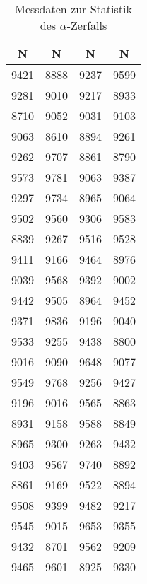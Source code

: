 \begin{table}[h!]
  \centering
  \caption{Messdaten zur Statistik des $\alpha$-Zerfalls}
  \label{tab:stat}
  \begin{tabular}{c c c c}
    \toprule
      N & N & N & N \\
    \midrule
      9421    &   8888    &    9237   &   9599\\
      9281    &   9010    &    9217   &   8933\\
      8710    &   9052    &    9031   &   9103\\
      9063    &   8610    &    8894   &   9261\\
      9262    &   9707    &    8861   &   8790\\
      9573    &   9781    &    9063   &   9387\\
      9297    &   9734    &    8965   &   9064\\
      9502    &   9560    &    9306   &   9583\\
      8839    &   9267    &    9516   &   9528\\
      9411    &   9166    &    9464   &   8976\\
      9039    &   9568    &    9392   &   9002\\
      9442    &   9505    &    8964   &   9452\\
      9371    &   9836    &    9196   &   9040\\
      9533    &   9255    &    9438   &   8800\\
      9016    &   9090    &    9648   &   9077\\
      9549    &   9768    &    9256   &   9427\\
      9196    &   9016    &    9565   &   8863\\
      8931    &   9158    &    9588   &   8849\\
      8965    &   9300    &    9263   &   9432\\
      9403    &   9567    &    9740   &   8892\\
      8861    &   9169    &    9522   &   8894\\
      9508    &   9399    &    9482   &   9217\\
      9545    &   9015    &    9653   &   9355\\
      9432    &   8701    &    9562   &   9209\\
      9465    &   9601    &    8925   &   9330\\


    \bottomrule
  \end{tabular}
\end{table}
